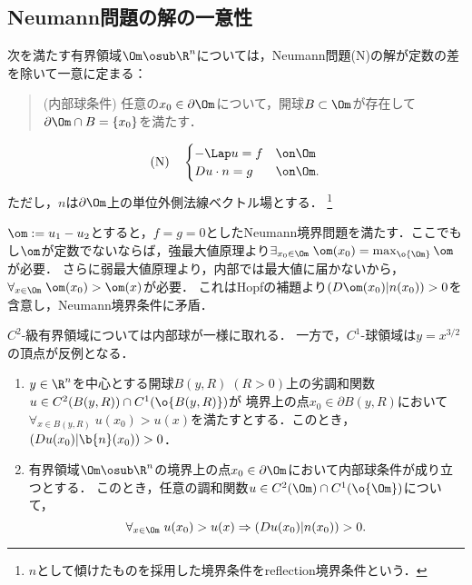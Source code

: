 \documentclass[uplatex,dvipdfmx]{jsreport}
\begin{document}
\subsection{Neumann問題の解の一意性}

\begin{corollary}[Neumann問題の一意性]
    次を満たす有界領域$\Om\osub\R^n$については，Neumann問題(N)の解が定数の差を除いて一意に定まる：
    \begin{quote}
        (内部球条件) 任意の$x_0\in\partial\Om$について，開球$B\subset\Om$が存在して$\partial\Om\cap B=\{x_0\}$を満たす．
    \end{quote}
    \[\mathrm{(N)}\quad\begin{cases}
        -\Lap u=f&\on\Om\\
        Du\cdot n=g&\on\Om.
    \end{cases}\]
    ただし，$n$は$\partial\Om$上の単位外側法線ベクトル場とする．
    \footnote{$n$として傾けたものを採用した境界条件をreflection境界条件という．}
\end{corollary}
\begin{Proof}
    $\om:=u_1-u_2$とすると，$f=g=0$としたNeumann境界問題を満たす．ここでもし$\om$が定数でないならば，強最大値原理より$\exists_{x_0\in\Om}\;\om(x_0)=\max_{\o{\Om}}\om$が必要．
    さらに弱最大値原理より，内部では最大値に届かないから，$\forall_{x\in\Om}\;\om(x_0)>\om(x)$が必要．
    これはHopfの補題より$(D\om(x_0)|n(x_0))>0$を含意し，Neumann境界条件に矛盾．
\end{Proof}

\begin{observation}
    $C^2$-級有界領域については内部球が一様に取れる．
    一方で，$C^1$-球領域は$y=x^{3/2}$の頂点が反例となる．
\end{observation}

\begin{lemma}\mbox{}
    \begin{enumerate}
        \item $y\in\R^n$を中心とする開球$B(y,R)\;(R>0)$上の劣調和関数
        $u\in C^2(B(y,R))\cap C^1(\o{B(y,R)})$が
        境界上の点$x_0\in\partial B(y,R)$において$\forall_{x\in B(y,R)}\;u(x_0)>u(x)$を満たすとする．このとき，$(Du(x_0)|\b{n}(x_0))>0$．
        \item 有界領域$\Om\osub\R^n$の境界上の点$x_0\in\partial\Om$において内部球条件が成り立つとする．
        このとき，任意の調和関数$u\in C^2(\Om)\cap C^1(\o{\Om})$について，
        \[\forall_{x\in\Om}\;u(x_0)>u(x)\Rightarrow (Du(x_0)|n(x_0))>0.\]
    \end{enumerate}
\end{lemma}
\end{document}
